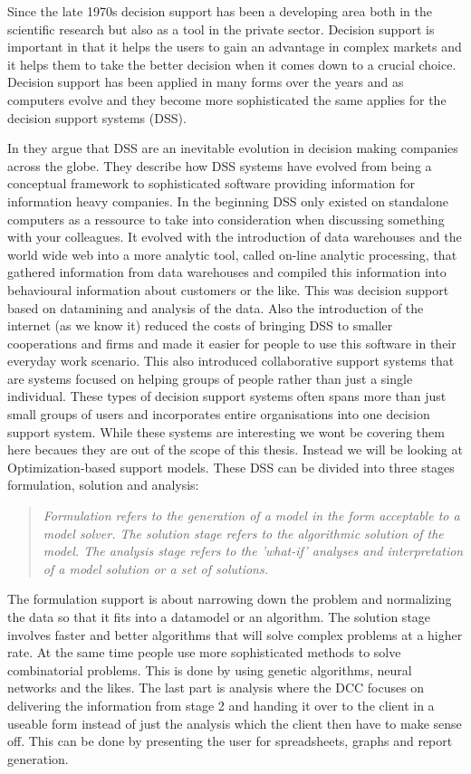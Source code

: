 Since the late 1970s decision support has been a developing area both in the scientific research but also as a tool in the private sector. Decision support is important in that it helps the users to gain an advantage in complex markets and it helps them to take the better decision when it comes down to a crucial choice. Decision support has been applied in many forms over the years and as computers evolve and they become more sophisticated the same applies for the decision support systems (DSS).

In \cite{shim2002past} they argue that DSS are an inevitable evolution in decision making companies across the globe. They describe how DSS systems have evolved from being a conceptual framework to sophisticated software providing information for information heavy companies. In the beginning DSS only existed on standalone computers as a ressource to take into consideration when discussing something with your colleagues. It evolved with the introduction of data warehouses and the world wide web into a more analytic tool, called on-line analytic processing, that gathered information from data warehouses and compiled this information into behavioural information about customers or the like. This was decision support based on datamining and analysis of the data. Also the introduction of the internet (as we know it) reduced the costs of bringing DSS to smaller cooperations and firms and made it easier for people to use this software in their everyday work scenario. This also introduced collaborative support systems that are systems focused on helping groups of people rather than just a single individual. These types of decision support systems often spans more than just small groups of users and incorporates entire organisations into one decision support system. While these systems are interesting we wont be covering them here becaues they are out of the scope of this thesis. Instead we will be looking at Optimization-based support models. These DSS can be divided into three stages formulation, solution and analysis\cite{shim2002past}:
\begin{quotation}
\textit{Formulation refers to the generation of a model in the form acceptable to a model solver. The solution stage refers to the algorithmic solution of the model. The analysis stage refers to the 'what-if' analyses and interpretation of a model solution or a set of solutions.}
\end{quotation}
The formulation support is about narrowing down the problem and normalizing the data so that it fits into a datamodel or an algorithm. The solution stage involves faster and better algorithms that will solve complex problems at a higher rate. At the same time people use more sophisticated methods to solve combinatorial problems. This is done by using genetic algorithms, neural networks and the likes\cite{shim2002past}. The last part is analysis where the DCC focuses on delivering the information from stage 2 and handing it over to the client in a useable form instead of just the analysis which the client then have to make sense off. This can be done by presenting the user for spreadsheets, graphs and report generation.

